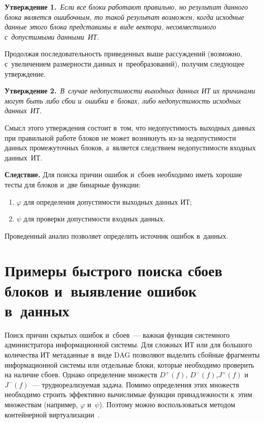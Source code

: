 \begin{multicols}{2}
  \smallskip
  
  \noindent
  \textbf{Утверждение 1.}\ \textit{Если все блоки работают правильно, но 
результат данного блока является ошибочным, то такой результат возможен, 
когда исходные данные этого блока представимы в~виде вектора, 
не\-со\-вмес\-ти\-мо\-го с~допустимыми данными~ИТ.} 
  
  Продолжая последовательность приведенных выше рассуждений (возможно, 
с~увеличением размерности данных и~преобразований), получим следующее 
утверждение.
  
  \smallskip
  
  \noindent
  \textbf{Утверждение 2.}\ \textit{В~случае недопустимости выходных данных 
ИТ их причинами могут быть либо сбои и~ошибки в~блоках, либо 
недопустимость исходных данных~ИТ.} 
  
  Смысл этого утверждения состоит в~том, что недопустимость выходных 
данных при правильной работе блоков не может возникнуть из-за 
не\-до\-пус\-ти\-мости данных промежуточных блоков, а~является следствием 
недопустимости входных дан\-ных~ИТ. 
  
  \smallskip
  
  \noindent
  \textbf{Следствие.} Для поиска причин ошибок и~сбоев необходимо иметь 
хорошие тесты для блоков и~две бинарные функции: 
  \begin{enumerate}[(1)]
\item $\varphi$ для определения допустимости выходных данных ИТ;
\item $\psi$ для проверки допустимости входных данных.
  \end{enumerate}
  
  Проведенный анализ позволяет определить источник ошибок в~данных.
  
  \section{Примеры быстрого поиска сбоев блоков и~выявление 
ошибок в~данных}
  
  Поиск причин скрытых ошибок и~сбоев~--- важная функция системного 
администратора информационной системы. Для сложных ИТ или для большого 
количества ИТ метаданные в~виде DAG позволяют выделить сбойные фрагменты 
информационной системы или отдельные блоки, которые необходимо проверить 
на наличие сбоев. Однако определение множеств $D^+(f)$, $D^-(f)$,\linebreak $J^+(f)$ 
и~$J^-(f)$~--- труднореализуемая задача. По\-мимо определения этих множеств 
необходимо строить эффективно вычислимые функции при\-над\-леж\-ности к~этим 
множествам (например, $\varphi$ и~$\psi$). 
  \mbox{Поэтому} можно воспользоваться методом контейнерной 
виртуализации~\cite{10-gr}. 


\end{multicols}

